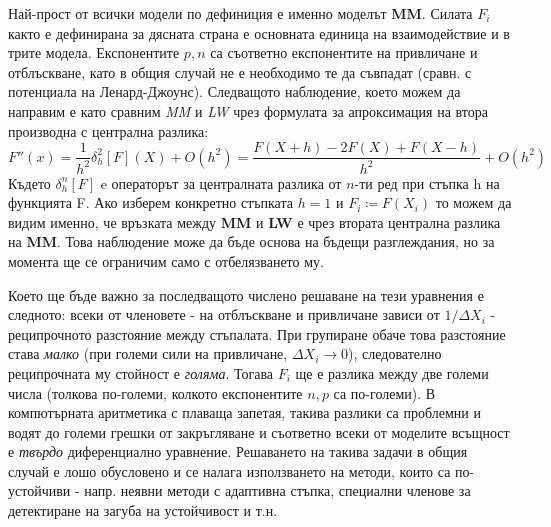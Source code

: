 \begin{table}[hbpt]
\caption{Конкретни изрази за безразмерните сили на привличане и отблъскване}
\label{tabl:rhs_bunching_ode}
\end{table}
Най-прост от всички модели по дефиниция е именно моделът \textbf{MM}. Силата $F_i$ както е дефинирана за дясната страна е основната единица на взаимодействие и в трите модела. Експонентите $p, n$ са съответно експонентите на привличане и отблъскване, като в общия случай не е необходимо те да съвпадат (сравн. с потенциала на Ленард-Джоунс).
Следващото наблюдение, което можем да направим е като сравним \textit{MM} и \textit{LW} чрез формулата за апроксимация на втора производна с централна разлика:
\begin{equation*}
    F''(x) = \frac{1}{h^2} \delta_h^2 [F](X) + O(h^2) = \frac{F(X+h) - 2F(X) + F(X-h)}{h^2} + O(h^2)
\end{equation*}
Където $\delta_h^n[F]$ e операторът за централната разлика от $n$-ти ред при стъпка h на функцията F.
Ако изберем конкретно стъпката $h = 1$ и $F_i \coloneqq F(X_i)$ то можем да видим именно, че връзката между \textbf{MM} и \textbf{LW} е чрез втората централна разлика на \textbf{MM}. Това наблюдение може да бъде основа на бъдещи разглеждания, но за момента ще се ограничим само с отбелязването му.

Което ще бъде важно за последващото числено решаване на тези уравнения е следното: всеки от членовете - на отблъскване и привличане зависи от $1/{\Delta X_{i}}$ - реципрочното разстояние между стъпалата. При групиране обаче това разстояние става \textit{малко} (при големи сили на привличане, $\Delta X_i \rightarrow 0$), следователно реципрочната му стойност е \textit{голяма}. Тогава $F_i$ ще е разлика между две големи числа (толкова по-големи, колкото експонентите $n, p$ са по-големи). В компютърната аритметика с плаваща запетая, такива разлики са проблемни и водят до големи грешки от закръгляване и съответно всеки от моделите всъщност е \textit{твърдо} диференциално уравнение. Решаването на такива задачи в общия случай е лошо обусловено и се налага използването на методи, които са по-устойчиви - напр. неявни методи с адаптивна стъпка, специални членове за детектиране на загуба на устойчивост и т.н.
